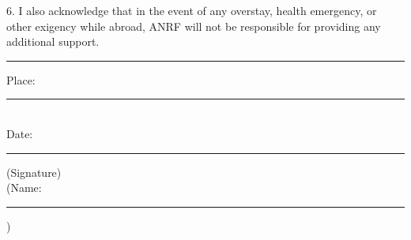 \documentclass[12pt,a4paper]{article}
\newcommand{\blankline}[1]{\rule{#1}{0.4pt}}
\begin{document}
\vspace{0.18in}

6. I also acknowledge that in the event of any overstay, health emergency, or other exigency while abroad, ANRF will not be responsible for providing any additional support.

\vspace{0.05in}
\noindent\rule{\textwidth}{0.4pt}

\vfill

\begin{minipage}[t]{0.45\textwidth}
Place: \blankline{0.28\textwidth}\\[0.8em]
Date: \blankline{0.28\textwidth}
\end{minipage}
\hfill
\begin{minipage}[t]{0.34\textwidth}
(Signature)\\[0.8em]
(Name: \blankline{0.20\textwidth})
\end{minipage}
\end{document}
